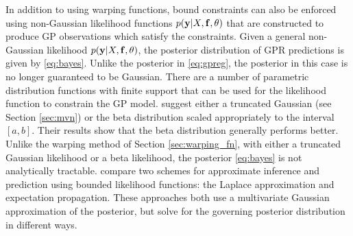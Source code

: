 \label{sec:likelihood_formulations}
In addition to using warping functions, bound constraints can also be enforced using non-Gaussian likelihood functions $p(\bold{y}|X,\bold{f},\theta)$ that are constructed to produce GP observations which satisfy the constraints. Given a general non-Gaussian likelihood $p(\bold{y} | X,\bold{f},{\theta})$, the posterior distribution of GPR predictions is given by \eqref{eq:bayes}.
Unlike the posterior in \eqref{eq:gpreg}, the posterior in this case is no longer guaranteed to be Gaussian. There are a number of parametric distribution functions with finite support that can be used for the likelihood function to constrain the GP model.   suggest either a truncated Gaussian (see Section \ref{sec:mvn}) or the beta distribution scaled appropriately to the interval $[a,b]$.  Their results show that the beta distribution generally performs better.  
Unlike the warping method of Section \ref{sec:warping_fn}, with either a truncated Gaussian likelihood or a beta likelihood, the 
posterior \eqref{eq:bayes} is not analytically tractable.  compare two schemes for 
approximate inference and prediction using bounded likelihood functions:  the Laplace approximation 
and expectation propagation.  These approaches both use a multivariate Gaussian approximation of the 
posterior, but solve for the governing posterior distribution in different ways.

